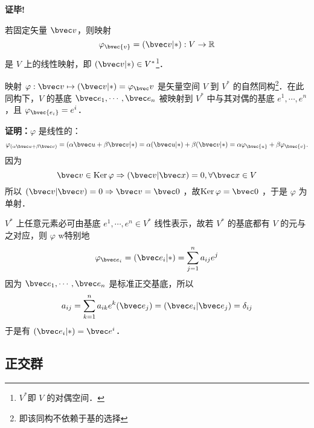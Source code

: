 \textbf{证毕!}

若固定矢量 $\bvec v$，则映射
\begin{equation}
\varphi_\bvec{v}=(\bvec v|*):V\rightarrow\mathbb{R}
\end{equation}
是 $V$ 上的线性映射，即 $(\bvec v|*)\in V^*$\footnote{$V^*$即 $V$ 的对偶空间．}．
\begin{theorem}{}
映射 $\varphi:\bvec v\mapsto (\bvec v|*)=\varphi_\bvec v$ 是矢量空间 $V$ 到 $V^*$ 的自然同构\footnote{即该同构不依赖于基的选择}．在此同构下，$V$ 的基底 $\bvec e_1,\cdots,\bvec e_n$ 被映射到 $V^*$ 中与其对偶的基底 $e^1,\cdots,e^n$，且 $\varphi_\bvec{e_i}=e^i$．
\end{theorem}
\textbf{证明：}$\varphi$ 是线性的：
\begin{equation}
\varphi_{(\alpha\bvec u+\beta\bvec v)}=(\alpha\bvec u+\beta\bvec v|*)=\alpha(\bvec u|*)+\beta(\bvec v|*)=\alpha\varphi_\bvec{u}+\beta\varphi_\bvec{v}.
\end{equation}
因为 
\begin{equation}
\bvec v\in \mathrm{Ker}\,\varphi\Rightarrow(\bvec v|\bvec x)=0,\forall\bvec x\in V
\end{equation}
所以 $(\bvec v|\bvec v)=0\Rightarrow\bvec v=\bvec 0$ ，故$\mathrm{Ker}\,\varphi=\bvec 0$ ，于是 $\varphi$ 为单射．

$V^*$ 上任意元素必可由基底 $e^1,\cdots,e^n\in V^*$ 线性表示，故若 $V^*$ 的基底都有 $V$ 的元与之对应，则 $\varphi$ w特别地
\begin{equation}
\varphi_{\bvec e_i}=(\bvec e_i|*)=\sum_{j=1}^{n} a_{ij}e^j
\end{equation}
因为  $\bvec e_1,\cdots,\bvec e_n$ 是标准正交基底，所以
\begin{equation}
a_{ij}=\sum_{k=1}^n a_{ik}e^k(\bvec e_j)=(\bvec e_i|\bvec e_j)=\delta_{ij}
\end{equation}
于是有 $(\bvec e_i|*)=\bvec e^i$．
\subsection{正交群}

